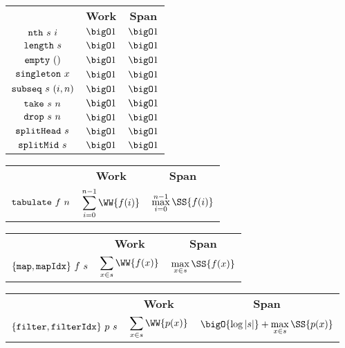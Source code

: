 \begin{costspec}
\begin{tabular}{c|c|c}
& \textbf{Work} & \textbf{Span} \\
$\texttt{nth}~s~i$ & $\bigO 1$ & $\bigO 1$ \\
$\texttt{length}~s$ & $\bigO 1$ & $\bigO 1$ \\
$\texttt{empty}~()$ & $\bigO 1$ & $\bigO 1$ \\
$\texttt{singleton}~x$ & $\bigO 1$ & $\bigO 1$ \\
$\texttt{subseq}~s~(i,n)$ & $\bigO 1$ & $\bigO 1$ \\
$\texttt{take}~s~n$ & $\bigO 1$ & $\bigO 1$ \\
$\texttt{drop}~s~n$ & $\bigO 1$ & $\bigO 1$ \\
$\texttt{splitHead}~s$ & $\bigO 1$ & $\bigO 1$ \\
$\texttt{splitMid}~s$ & $\bigO 1$ & $\bigO 1$
\end{tabular}
\end{costspec}

\begin{costspec}[Tabulate]
\begin{tabular}{c|c|c}
& \textbf{Work} & \textbf{Span} \\
%
$\texttt{tabulate}~f~n$ &
$\displaystyle \sum_{i = 0}^{n-1} \WW{f(i)}$ &
$\displaystyle \max_{i = 0}^{n-1} \SS{f(i)}$ \\
%
\end{tabular}
\end{costspec}



\begin{costspec}[Map]
\begin{tabular}{c|c|c}
& \textbf{Work} & \textbf{Span} \\
%
$\{\texttt{map},\texttt{mapIdx}\}~f~s$ &
$\displaystyle \sum_{x \in s} \WW{f(x)}$ &
$\displaystyle \max_{x \in s} \SS{f(x)}$ \\
%
\end{tabular}
\end{costspec}

\begin{costspec}[Filter]
\begin{tabular}{c|c|c}
& \textbf{Work} & \textbf{Span} \\
%
$\{\texttt{filter},\texttt{filterIdx}\}~p~s$ &
$\displaystyle \sum_{x \in s} \WW{p(x)}$ &
$\displaystyle \bigO{\log{|s|}} + \max_{x \in s} \SS{p(x)}$ \\
%
\end{tabular}
\end{costspec}

